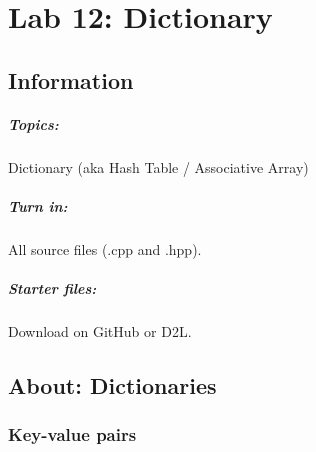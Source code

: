 \documentclass[a4paper,12pt,oneside]{book}
\title{}
\author{Rachel Morris}
\date{\today}
\newcommand{\laLab}{Lab 12: Dictionary\ }
\begin{document}
    \chapter*{\laLab} 

        \section{Information}
            \paragraph{ Topics: } Dictionary (aka Hash Table / Associative Array)
            \paragraph{ Turn in: } All source files (.cpp and .hpp).
            \paragraph{ Starter files: } Download on GitHub or D2L.
         




\renewcommand*\DTstylecomment{\rmfamily\color{green}\textsc}

\begin{framed}
\end{framed}
   

\tableofcontents

\section{About: Dictionaries}

\subsection{Key-value pairs}
\end{document}
